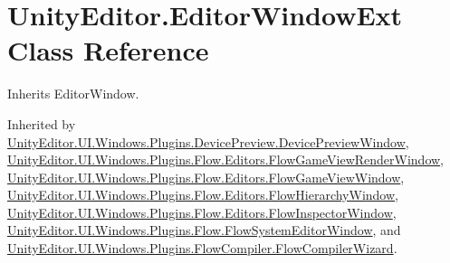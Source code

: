 \hypertarget{class_unity_editor_1_1_editor_window_ext}{}\section{Unity\+Editor.\+Editor\+Window\+Ext Class Reference}
\label{class_unity_editor_1_1_editor_window_ext}


Inherits Editor\+Window.



Inherited by \hyperlink{class_unity_editor_1_1_u_i_1_1_windows_1_1_plugins_1_1_device_preview_1_1_device_preview_window}{Unity\+Editor.\+U\+I.\+Windows.\+Plugins.\+Device\+Preview.\+Device\+Preview\+Window}, \hyperlink{class_unity_editor_1_1_u_i_1_1_windows_1_1_plugins_1_1_flow_1_1_editors_1_1_flow_game_view_render_window}{Unity\+Editor.\+U\+I.\+Windows.\+Plugins.\+Flow.\+Editors.\+Flow\+Game\+View\+Render\+Window}, \hyperlink{class_unity_editor_1_1_u_i_1_1_windows_1_1_plugins_1_1_flow_1_1_editors_1_1_flow_game_view_window}{Unity\+Editor.\+U\+I.\+Windows.\+Plugins.\+Flow.\+Editors.\+Flow\+Game\+View\+Window}, \hyperlink{class_unity_editor_1_1_u_i_1_1_windows_1_1_plugins_1_1_flow_1_1_editors_1_1_flow_hierarchy_window}{Unity\+Editor.\+U\+I.\+Windows.\+Plugins.\+Flow.\+Editors.\+Flow\+Hierarchy\+Window}, \hyperlink{class_unity_editor_1_1_u_i_1_1_windows_1_1_plugins_1_1_flow_1_1_editors_1_1_flow_inspector_window}{Unity\+Editor.\+U\+I.\+Windows.\+Plugins.\+Flow.\+Editors.\+Flow\+Inspector\+Window}, \hyperlink{class_unity_editor_1_1_u_i_1_1_windows_1_1_plugins_1_1_flow_1_1_flow_system_editor_window}{Unity\+Editor.\+U\+I.\+Windows.\+Plugins.\+Flow.\+Flow\+System\+Editor\+Window}, and \hyperlink{class_unity_editor_1_1_u_i_1_1_windows_1_1_plugins_1_1_flow_compiler_1_1_flow_compiler_wizard}{Unity\+Editor.\+U\+I.\+Windows.\+Plugins.\+Flow\+Compiler.\+Flow\+Compiler\+Wizard}.


